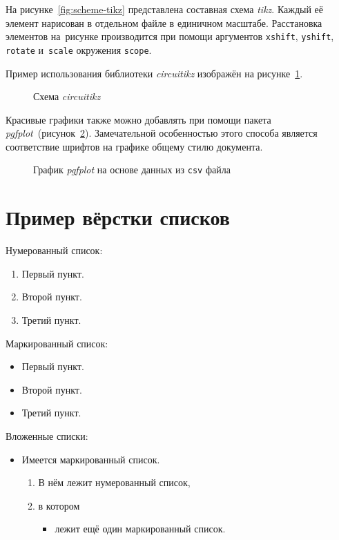 На рисунке~\cref{fig:scheme-tikz} представлена составная схема \textit{tikz}.
Каждый её элемент нарисован в отдельном файле в единичном масштабе.
Расстановка элементов на~рисунке производится при помощи аргументов \texttt{xshift},
\texttt{yshift}, \texttt{rotate} и~\texttt{scale} окружения \texttt{scope}.

Пример использования библиотеки \textit{circuitikz} изображён на рисунке~\cref{fig:circuitikz}.

\begin{figure}[htbp]
    \centerfloat{
        
    }
    \caption{Схема \textit{circuitikz}}\label{fig:circuitikz}
\end{figure}

Красивые графики также можно добавлять при помощи пакета \textit{pgfplot}~(рисунок~\cref{fig:pgfplot}).
Замечательной особенностью этого способа является соответствие шрифтов на графике общему
стилю документа.

\begin{figure}[htbp]
    \centerfloat{
        
    }
    \caption{График \textit{pgfplot} на основе данных из \texttt{csv} файла}\label{fig:pgfplot}
\end{figure}


\section{Пример вёрстки списков}\label{sec:ch5/sec3}

\noindent Нумерованный список:
\begin{enumerate}
    \item Первый пункт.
    \item Второй пункт.
    \item Третий пункт.
\end{enumerate}

\noindent Маркированный список:
\begin{itemize}
    \item Первый пункт.
    \item Второй пункт.
    \item Третий пункт.
\end{itemize}

\noindent Вложенные списки:
\begin{itemize}
    \item Имеется маркированный список.
          \begin{enumerate}
              \item В нём лежит нумерованный список,
              \item в котором
                    \begin{itemize}
                        \item лежит ещё один маркированный список.
                    \end{itemize}
          \end{enumerate}
\end{itemize}

